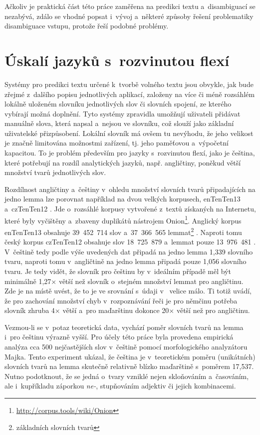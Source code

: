 \documentclass[a4paper,11pt,openany]{book} %
\begin{document}
Ačkoliv je praktická část této práce zaměřena na predikci textu a~disambiguací se nezabývá, zdálo se vhodné popsat i~vývoj a~některé způsoby řešení problematiky disambiguace vstupu, protože řeší podobné problémy.

\section{Úskalí jazyků s~rozvinutou flexí}

Systémy pro predikci textu určené k~tvorbě volného textu jsou obvykle, jak bude zřejmé z~dalšího popisu jednotlivých aplikací, založeny na více či méně rozsáhlém lokálně uloženém slovníku jednotlivých slov či slovních spojení, ze kterého vybírají možná doplnění. Tyto systémy zpravidla umožňují uživateli přidávat manuálně slova, která napsal a~nejsou ve slovníku, což slouží jako základní uživatelské přizpůsobení. Lokální slovník má ovšem tu nevýhodu, že jeho velikost je značně limitována možnostmi zařízení, tj. jeho paměťovou a~výpočetní kapacitou. To je problém především pro jazyky s~rozvinutou flexí, jako je čeština, které potřebují na rozdíl analytických jazyků, např. angličtiny, poněkud větší množství tvarů jednotlivých slov. 

Rozdílnost angličtiny a~češtiny v~ohledu množství slovních tvarů připadajících na jedno lemma lze porovnat například na dvou velkých korpusech, enTenTen13 a~czTenTen12 \parencite{suchomel2012}. Jde o~rozsáhlé korpusy vytvořené z~textů získaných na Internetu, které byly vyčištěny a~zbaveny duplikátů nástrojem Onion\footnote{\url{http://corpus.tools/wiki/Onion}}. Anglický korpus enTenTen13 obsahuje 39~452~714 slov a~37~366~565 lemmat\footnote{základních slovních tvarů} \parencite{czTenTen12_info}. Naproti tomu český korpus czTenTen12 obsahuje slov 18~725~879 a~lemmat pouze 13~976~481 \parencite{enTenTen13_info}. V~češtině tedy podle výše uvedených dat připadá na jedno lemma 1,339 slovního tvaru, naproti tomu v~angličtině na jedno lemma připadá pouze 1,056 slovního tvaru. Je tedy vidět, že slovník pro češtinu by v~ideálním případě měl být minimálně 1,27× větší než slovník o~stejném množství lemmat pro angličtinu. Zde je na místě uvést, že to je ve srovnání s~údaji v~\parencite{nemeth2012word} velice málo. Ti totiž uvádí, že pro zachování množství chyb v~rozpoznávání řeči je pro němčinu potřeba slovník zhruba 4× větší a~pro maďarštinu dokonce 20× větší než pro angličtinu.

Vezmou-li se v~potaz teoretická data, vychází poměr slovních tvarů na lemma i~pro češtinu výrazně vyšší. Pro účely této práce byla provedena empirická analýza cca 500 nejčastějších slov v~češtině pomocí morfologického analyzátoru Majka. Tento experiment ukázal, že čeština je v~teoretickém poměru (unikátních) slovních tvarů na lemma skutečně relativně blízko maďarštině s~poměrem 17,537. Nutno podotknout, že se jedná o~tvary vzniklé nejen skloňováním a~časováním, ale i~kupříkladu záporkou {\it ne-}, stupňováním adjektiv či jejich kombinacemi.
\end{document}

